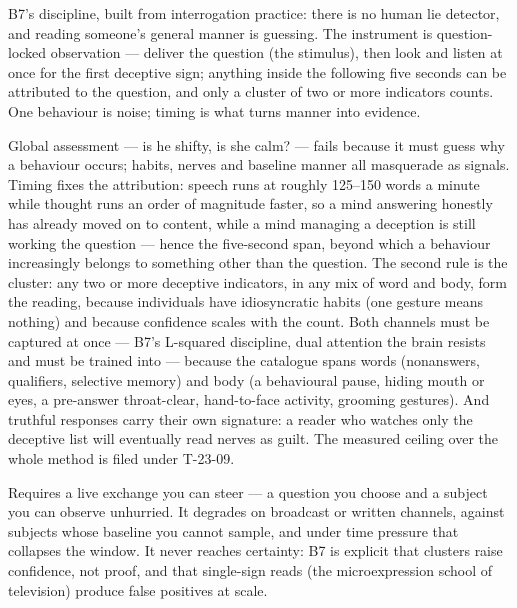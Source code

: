 \begin{core}
B7's discipline, built from interrogation practice: there is no human lie detector, and reading someone's general manner is guessing. The instrument is question-locked observation --- deliver the question (the stimulus), then look and listen at once for the first deceptive sign; anything inside the following five seconds can be attributed to the question, and only a cluster of two or more indicators counts. One behaviour is noise; timing is what turns manner into evidence.
\end{core}
\begin{mechanism}
Global assessment --- is he shifty, is she calm? --- fails because it must guess why a behaviour occurs; habits, nerves and baseline manner all masquerade as signals. Timing fixes the attribution: speech runs at roughly 125--150 words a minute while thought runs an order of magnitude faster, so a mind answering honestly has already moved on to content, while a mind managing a deception is still working the question --- hence the five-second span, beyond which a behaviour increasingly belongs to something other than the question. The second rule is the cluster: any two or more deceptive indicators, in any mix of word and body, form the reading, because individuals have idiosyncratic habits (one gesture means nothing) and because confidence scales with the count. Both channels must be captured at once --- B7's L-squared discipline, dual attention the brain resists and must be trained into --- because the catalogue spans words (nonanswers, qualifiers, selective memory) and body (a behavioural pause, hiding mouth or eyes, a pre-answer throat-clear, hand-to-face activity, grooming gestures). And truthful responses carry their own signature: a reader who watches only the deceptive list will eventually read nerves as guilt. The measured ceiling over the whole method is filed under T-23-09.
\end{mechanism}
\begin{conditions}
Requires a live exchange you can steer --- a question you choose and a subject you can observe unhurried. It degrades on broadcast or written channels, against subjects whose baseline you cannot sample, and under time pressure that collapses the window. It never reaches certainty: B7 is explicit that clusters raise confidence, not proof, and that single-sign reads (the microexpression school of television) produce false positives at scale.
\end{conditions}
